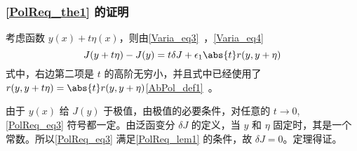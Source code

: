  \subsubsection{\autoref{PolReq_the1} 的证明}
考虑函数 $y(x)+t\eta(x)$，则由\autoref{Varia_eq3}~，\autoref{Varia_eq4}~
\begin{equation}\label{PolReq_eq3}
J(y+t\eta)-J(y)=t\delta J+\epsilon_1\abs{t}r(y,y+\eta)
\end{equation}
式中，右边第二项是 $t$ 的高阶无穷小，并且式中已经使用了 $r(y,y+t\eta)=\abs{t}r(y,y+\eta)$\autoref{AbPol_def1}~。

由于 $y(x)$ 给 $J(y)$ 于极值，由极值的必要条件，对任意的 $t\rightarrow0$, \autoref{PolReq_eq3} 符号都一定。由泛函变分 $\delta J$ 的定义，当 $y$ 和 $\eta$ 固定时，其是一个常数。所以\autoref{PolReq_eq3} 满足\autoref{PolReq_lem1} 的条件，故 $\delta J=0$。定理得证。